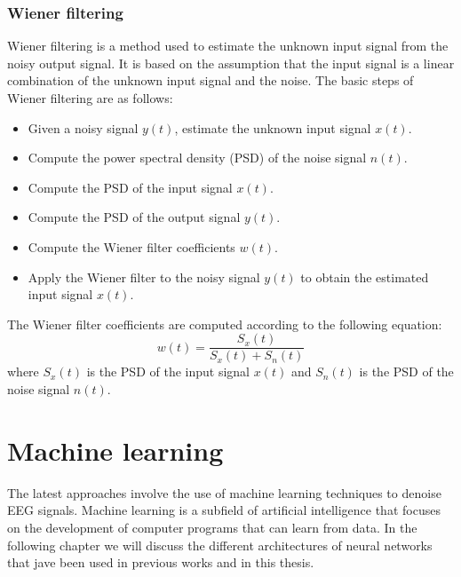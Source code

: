 \documentclass[a4paper]{sapthesis}
\begin{document}
\subsubsection{Wiener filtering}
Wiener filtering\cite{wiener} is a method used to estimate the unknown
input signal from the noisy output signal. It is based on the assumption
that the input signal is a linear combination of the unknown input signal
and the noise. \newline
The basic steps of Wiener filtering are as follows:
\begin{itemize}
    \item Given a noisy signal $y(t)$, estimate the unknown input signal
    $x(t)$.
    \item Compute the power spectral density (PSD) of the noise signal
    $n(t)$.
    \item Compute the PSD of the input signal $x(t)$.
    \item Compute the PSD of the output signal $y(t)$.
    \item Compute the Wiener filter coefficients $w(t)$.
    \item Apply the Wiener filter to the noisy signal $y(t)$ to obtain the
    estimated input signal $x(t)$.
\end{itemize}
The Wiener filter coefficients are computed according to the following
equation:
\begin{equation}
\label{eq:wiener}
w(t) = \frac{S_x(t)}{S_x(t) + S_n(t)}
\end{equation}
where $S_x(t)$ is the PSD of the input signal $x(t)$ and $S_n(t)$ is the
PSD of the noise signal $n(t)$. \newline



\section{Machine learning}
The latest approaches involve the use of machine learning techniques
to denoise EEG signals. Machine learning is a subfield of artificial
intelligence that focuses on the development of computer programs that
can learn from data. In the following chapter we will discuss the
different architectures of neural networks that jave been used in 
previous works and in this thesis.
\end{document}
